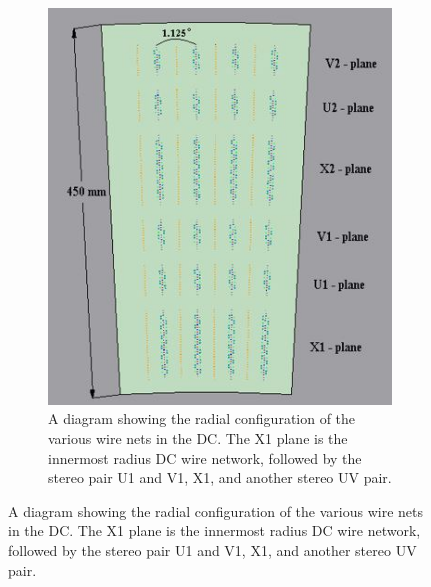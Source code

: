 \begin{figure}[p]
  \centering
\begin{subfigure}[p]{1\textwidth}
  \centering
    \includegraphics[width=1\textwidth]{Figures/dcdiagram.jpg}
  \caption{A diagram showing the radial configuration of the various wire nets in the DC. The X1 plane is the innermost radius DC wire network, followed by the stereo pair U1 and V1, X1, and another stereo UV pair.}
  \label{fig:radialdcdiagram}
\end{subfigure}
\end{figure}

